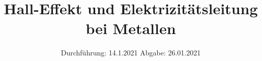 

\subject{Versuch Nr.V703}
\title{Hall-Effekt und Elektrizitätsleitung bei Metallen}
\date{%
  Durchführung: 14.1.2021
  \hspace{3em}
  Abgabe: 26.01.2021
}



\maketitle
\thispagestyle{empty}
\tableofcontents
\newpage 




%
%
%

\nocite{*}

\printbibliography{}



